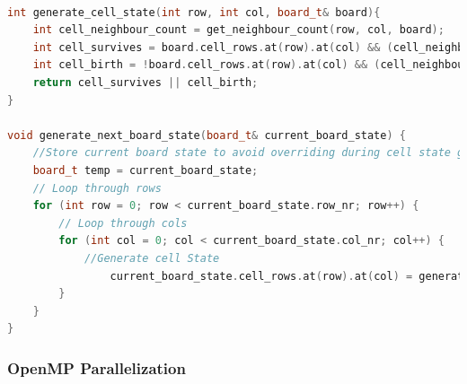 \documentclass[a4paper,english,12pt,twoside=false]{scrartcl} %
\begin{document}
\begin{lstlisting}[caption={Naive State Generation Algorithm},label={lst:gol-naive-generation-algorithm},language=C++]

int generate_cell_state(int row, int col, board_t& board){
    int cell_neighbour_count = get_neighbour_count(row, col, board);
    int cell_survives = board.cell_rows.at(row).at(col) && (cell_neighbour_count == 2 || cell_neighbour_count == 3);
    int cell_birth = !board.cell_rows.at(row).at(col) && (cell_neighbour_count == 3);
    return cell_survives || cell_birth;
}

void generate_next_board_state(board_t& current_board_state) {
    //Store current board state to avoid overriding during cell state generation
    board_t temp = current_board_state;
    // Loop through rows
    for (int row = 0; row < current_board_state.row_nr; row++) {
        // Loop through cols
        for (int col = 0; col < current_board_state.col_nr; col++) {
        	//Generate cell State
        		current_board_state.cell_rows.at(row).at(col) = generate_cell_state(row, col, temp);
        }
    }
}
\end{lstlisting}

\subsubsection{OpenMP Parallelization}
\end{document}

